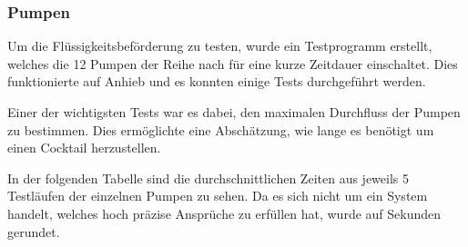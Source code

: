 \subsubsection{Pumpen}
\label{subsubsec:Inbetriebnahme_Pumpen}

Um die Flüssigkeitsbeförderung zu testen, wurde ein Testprogramm erstellt, welches die 12 Pumpen der Reihe nach für eine kurze Zeitdauer einschaltet. Dies funktionierte auf Anhieb und es konnten einige Tests durchgeführt werden. 

Einer der wichtigsten Tests war es dabei, den maximalen Durchfluss der Pumpen zu bestimmen. Dies ermöglichte eine Abschätzung, wie lange es benötigt um einen Cocktail herzustellen. 

In der folgenden Tabelle sind die durchschnittlichen Zeiten aus jeweils 5 Testläufen der einzelnen Pumpen zu sehen. Da es sich nicht um ein System handelt, welches hoch präzise Ansprüche zu erfüllen hat, wurde auf Sekunden gerundet.


